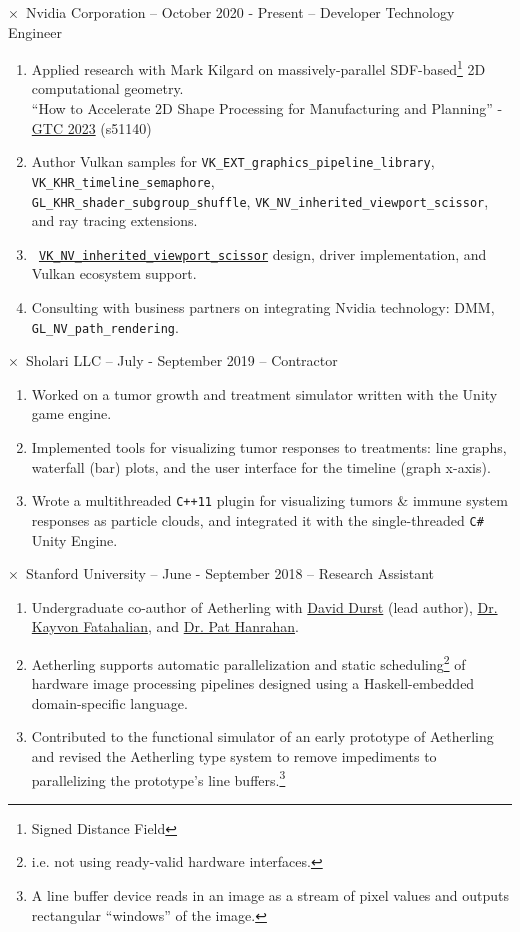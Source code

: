 \documentclass[11pt]{article}
\newcommand{\webText}[2]{{\color{webColor} \href{#1}{#2}}}
\newcommand{\mySub}[1]{{\color{subColor}\hspace{-6mm} \( \times \)\ \textsf{#1}}}
\newcommand{\lighttt}[1]{{\color{lightttColor}\texttt{#1}}}
\begin{document}
\mySub{Nvidia Corporation -- October 2020 - Present -- Developer Technology Engineer}
\begin{enumerate}
\item Applied research with Mark Kilgard on
  massively-parallel SDF-based\footnote{Signed Distance Field} 2D
  computational geometry.\\
  ``How to Accelerate 2D Shape Processing for Manufacturing and Planning''
  - \webText{https://www.nvidia.com/en-us/on-demand/session/gtcspring23-s51140/}{GTC 2023}
  (s51140)

\item Author Vulkan samples for
  \lighttt{VK\_EXT\_graphics\_pipeline\_library},
  \lighttt{VK\_KHR\_timeline\_semaphore},\\
  \lighttt{GL\_KHR\_shader\_subgroup\_shuffle},
  \lighttt{VK\_NV\_inherited\_viewport\_scissor}, and ray tracing extensions.

\item
  \texttt{\webText{https://registry.khronos.org/vulkan/specs/1.3-extensions/man/html/VK_NV_inherited_viewport_scissor.html}{VK\_NV\_inherited\_viewport\_scissor}}
  design, driver implementation, and Vulkan ecosystem support.

\item Consulting with business partners on integrating Nvidia
  technology: DMM, \lighttt{GL\_NV\_path\_rendering}.
\end{enumerate}
\filbreak
\mySub{Sholari LLC -- July - September 2019 -- Contractor}
\begin{enumerate}
\item Worked on a tumor growth and treatment simulator written with
  the Unity game engine.
\item Implemented tools for visualizing tumor responses to treatments:
  line graphs, waterfall (bar) plots, and the user interface for the
  timeline (graph x-axis).
\item Wrote a multithreaded \lighttt{C++11} plugin for visualizing
  tumors \& immune system responses as particle clouds, and integrated
  it with the single-threaded \lighttt{C\#} Unity Engine.
\end{enumerate}
\filbreak
\mySub{Stanford University -- June - September 2018 --
  Research Assistant}
\begin{enumerate}
\item Undergraduate co-author of Aetherling with
  \webText{https://david-durst.github.io/}{David Durst} (lead author),
  \webText{https://graphics.stanford.edu/~kayvonf/}{Dr. Kayvon Fatahalian},
  and \webText{https://graphics.stanford.edu/~hanrahan/}{Dr. Pat Hanrahan}.
\item Aetherling supports automatic parallelization and static
  scheduling\footnote{i.e. not using ready-valid hardware interfaces.}
  of hardware image processing pipelines designed using a
  Haskell-embedded domain-specific language.
\item Contributed to the functional simulator of an early prototype of
  Aetherling and revised the Aetherling type system to remove
  impediments to parallelizing the prototype's line
  buffers.\footnote{A line buffer device reads in an image as a stream
    of pixel values and outputs rectangular ``windows'' of
    the image.}
\end{enumerate}
\end{document}
